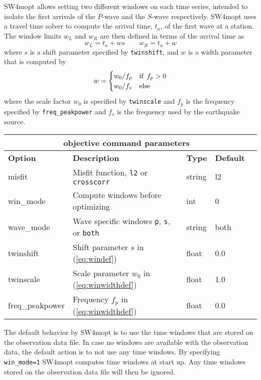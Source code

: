 \documentclass[12pt]{report}
\begin{document}
SW4mopt allows setting two different windows on each time series, 
intended to isolate the first arrivals of the $P$-wave and the $S$-wave respectively.
SW4mopt uses a travel time solver to compute the arrival time, $t_a$, of the first wave
at a station. The window limits $w_L$ and $w_R$ are then defined in terms of the arrival
time as 
\begin{equation}
w_L = t_a + w s\qquad w_R = t_a + w
\label{eq:windef}
\end{equation}
where $s$ is a shift parameter specified by {\tt twinshift}, and $w$ is a width parameter
that is computed by 
\begin{equation}
w=\begin{cases} w_0/f_p & \hbox{if}\enskip f_p>0 \\
                w_0/f_s & \hbox{else} \end{cases}
\label{eq:winwidthdef}
\end{equation}
where the scale factor $w_0$ is specified by {\tt twinscale} and
$f_p$ is the frequency specified by {\tt freq\_peakpower} and $f_s$ is the frequency
used by the earthquake source.
\begin{center}
\begin{tabular}{|l|p{7cm}|l|l|l|} \hline
\multicolumn{4}{|c|}{\bf objective command parameters}\\ \hline
{\bf Option} & {\bf Description}          & {\bf Type} & {\bf Default} \\ \hline 
\hline
misfit     & Misfit function, {\tt l2} or {\tt crosscorr} & string   & l2 \\ \hline
win\_mode  & Compute windows before optimizing    & int & 0 \\ \hline  
wave\_mode & Wave specific windows {\tt p}, {\tt s}, or {\tt both} & string & both \\ \hline
twinshift  & Shift parameter $s$ in (\ref{eq:windef})  & float & 0.0 \\ \hline
twinscale  & Scale parameter $w_0$ in (\ref{eq:winwidthdef})  & float & 1.0 \\ \hline
freq\_peakpower & Frequency $f_p$ in (\ref{eq:winwidthdef}) & float &  0.0 \\ \hline
\end{tabular}
\end{center}
The default behavior by SW4mopt is to use the time windows that are stored on the observation
data file. In case no windows are available with the observation data, the default action
is to not use any time windows. By specifying {\tt win\_mode=1} SW4mopt computes time windows
at start up. Any time windows stored on the observation data file will then be ignored.
\end{document}
